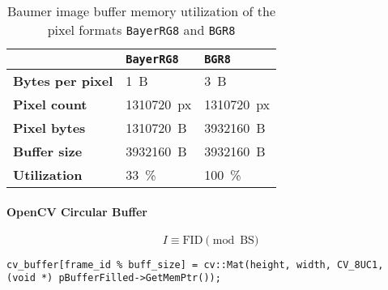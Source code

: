 \begin{table}[h]
  \caption{Baumer image buffer memory utilization of the pixel formats \texttt{BayerRG8} and \texttt{BGR8}}
  \label{tab:buffer_memory_utilization}
  \centering
  \begin{tabular}{lll}
    \toprule
     & \textbf{\texttt{BayerRG8}} & \textbf{\texttt{BGR8}} \\
    \midrule
    \textbf{Bytes per pixel} & \SI{1}{B} & \SI{3}{B} \\
    \textbf{Pixel count} & \SI{1310720}{px} & \SI{1310720}{px} \\
    \textbf{Pixel bytes} & \SI{1310720}{B} & \SI{3932160}{B} \\
    \textbf{Buffer size} & \SI{3932160}{B} & \SI{3932160}{B} \\
    \textbf{Utilization} & \SI{33}{\percent} & \SI{100}{\percent} \\
    \bottomrule
  \end{tabular}
\end{table}

\paragraph{OpenCV Circular Buffer}





\begin{equation}
  I \equiv \text{FID} \pmod{\text{BS}}
  \label{eq:indexing}
\end{equation}

\begin{lstlisting}[style=C++]
  cv_buffer[frame_id % buff_size] = cv::Mat(height, width, CV_8UC1, (void *) pBufferFilled->GetMemPtr());
\end{lstlisting}




